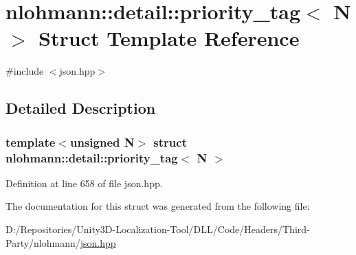 \hypertarget{structnlohmann_1_1detail_1_1priority__tag}{}\section{nlohmann\+::detail\+::priority\+\_\+tag$<$ N $>$ Struct Template Reference}
\label{structnlohmann_1_1detail_1_1priority__tag}


{\ttfamily \#include $<$json.\+hpp$>$}



\subsection{Detailed Description}
\subsubsection*{template$<$unsigned N$>$\newline
struct nlohmann\+::detail\+::priority\+\_\+tag$<$ N $>$}



Definition at line 658 of file json.\+hpp.



The documentation for this struct was generated from the following file\+:\begin{DoxyCompactItemize}
\item 
D\+:/\+Repositories/\+Unity3\+D-\/\+Localization-\/\+Tool/\+D\+L\+L/\+Code/\+Headers/\+Third-\/\+Party/nlohmann/\mbox{\hyperlink{json_8hpp}{json.\+hpp}}\end{DoxyCompactItemize}
